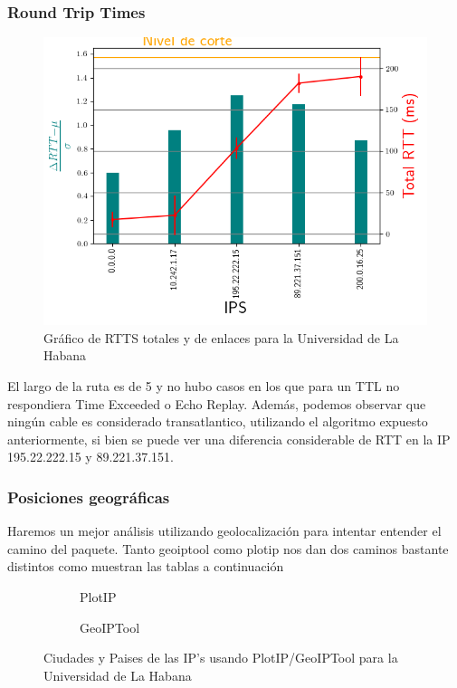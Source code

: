 \subsubsection{Round Trip Times}

\begin{figure}[ht]
	\begin{center}
		\includegraphics[width=0.6\columnwidth]{imagenes/rtts_habana.png}
		\caption{Gráfico de RTTS totales y de enlaces para la Universidad de La Habana}
	\end{center}
\end{figure}

El largo de la ruta es de 5 y no hubo casos en los que para un TTL no respondiera
Time Exceeded o Echo Replay. Adem\'as, podemos observar que ningún cable es considerado
transatlantico, utilizando el algoritmo expuesto anteriormente, si bien se
puede ver una diferencia considerable de RTT en la IP 195.22.222.15 y
89.221.37.151.  \\

\subsubsection{Posiciones geográficas}

Haremos un mejor an\'alisis utilizando geolocalizaci\'on para intentar entender
el camino del paquete. Tanto geoiptool como plotip nos dan dos caminos bastante
distintos como muestran las tablas a continuaci\'on

\begin{figure}[ht]
	\begin{subfigure}[b]{0.5\textwidth}
		\centering
		
		\caption{PlotIP}
	\end{subfigure}
	\begin{subfigure}[b]{0.5\textwidth}
		\centering
		
		\caption{GeoIPTool}
	\end{subfigure}
	\caption{Ciudades y Paises de las IP's usando PlotIP/GeoIPTool para la Universidad de La Habana}
\end{figure}


